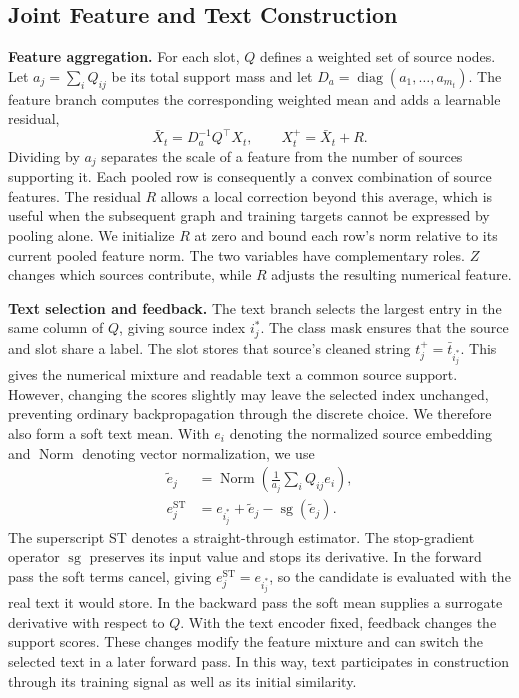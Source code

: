 \subsection{Joint Feature and Text Construction}
\label{sec:method_payload}

\textbf{Feature aggregation.}
For each slot, $Q$ defines a weighted set of source nodes. Let
$a_j=\sum_i Q_{ij}$ be its total support mass and let
$D_a=\operatorname{diag}(a_1,\ldots,a_{m_t})$. The feature branch computes
the corresponding weighted mean and adds a learnable residual,
\begin{equation}
 \bar X_t=D_a^{-1}Q^{\top}X_t,\qquad
 X_t^{+}=\bar X_t+R .
\label{eq:method_feature}
\end{equation}
Dividing by $a_j$ separates the scale of a feature from the number of
sources supporting it. Each pooled row is consequently a convex
combination of source features. The residual $R$ allows a local correction
beyond this average, which is useful when the subsequent graph and
training targets cannot be expressed by pooling alone. We initialize $R$
at zero and bound each row's norm relative to its current pooled feature
norm. The two variables have complementary roles. $Z$ changes which
sources contribute, while $R$ adjusts the resulting numerical feature.

\textbf{Text selection and feedback.}
The text branch selects the largest entry in the same column of $Q$,
giving source index $i_j^*$. The class mask ensures that the source and
slot share a label. The slot stores that source's
cleaned string $t_j^+=\bar t_{i_j^*}$. This gives the numerical mixture
and readable text a common source support. However, changing the scores
slightly may leave the selected index unchanged, preventing ordinary
backpropagation through the discrete choice. We therefore also form a
soft text mean. With $e_i$ denoting the normalized source embedding and
$\operatorname{Norm}$ denoting vector normalization, we use
\begin{equation}
\begin{aligned}
 \widetilde e_j
   &=\operatorname{Norm}\!\left(\frac{1}{a_j}\sum_i Q_{ij}e_i\right),\\
 e_j^{\mathrm{ST}}
   &=e_{i_j^*}+\widetilde e_j-\operatorname{sg}(\widetilde e_j).
\end{aligned}
\label{eq:method_text}
\end{equation}
The superscript ST denotes a straight-through estimator. The stop-gradient
operator $\operatorname{sg}$ preserves its input value
and stops its derivative. In the forward pass the soft terms cancel,
giving $e_j^{\mathrm{ST}}=e_{i_j^*}$, so the candidate is evaluated with
the real text it would store. In the backward pass the soft mean supplies
a surrogate derivative with respect to $Q$. With the text encoder fixed,
feedback changes the support scores. These changes modify
the feature mixture and can switch the selected text in a later forward
pass. In this way, text participates in construction through its training
signal as well as its initial similarity.

